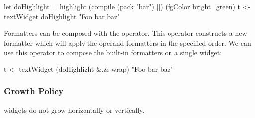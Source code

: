 \begin{haskellcode}
 let doHighlight = highlight (compile (pack "bar") [])
                     (fgColor bright_green)
 t <- textWidget doHighlight "Foo bar baz"
\end{haskellcode}

Formatters can be composed with the  operator.  This
operator constructs a new formatter which will apply the operand
formatters in the specified order.  We can use this operator to
compose the built-in formatters on a single  widget:

\begin{haskellcode}
 t <- textWidget (doHighlight &.& wrap) "Foo bar baz"
\end{haskellcode}

\subsubsection{Growth Policy}

 widgets do not grow horizontally or vertically.
